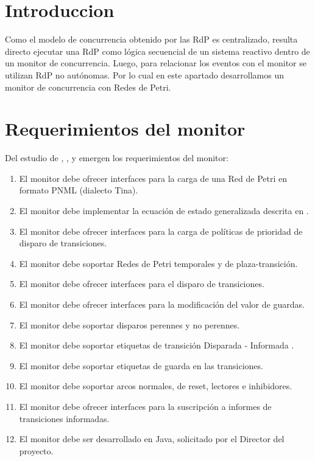 \section{Introduccion}
\label{sec:petri_concurrency_monitor_intro}
Como el modelo de concurrencia obtenido por las RdP es centralizado, resulta
directo ejecutar una RdP como lógica secuencial de un sistema reactivo dentro
de un monitor de concurrencia. Luego, para relacionar los eventos con el
monitor se utilizan RdP no autónomas. Por lo cual en este apartado desarrollamos
un monitor de concurrencia con Redes de Petri.

\section{Requerimientos del monitor}
Del estudio de \cite{Ecuacion_generalizada_LAC}, \cite{codegen}, \cite{chimp} y
\cite{Bentivegna-Ludemann} emergen los requerimientos del monitor:
    \begin{enumerate}
      \item El monitor debe ofrecer interfaces para la carga de una Red de
      Petri en formato PNML (dialecto Tina).
      \item El monitor debe implementar la ecuación de estado generalizada
      descrita en \cite{Ecuacion_generalizada_LAC}.
      \item El monitor debe ofrecer interfaces para la carga de políticas de
      prioridad de disparo de transiciones.
      \item El monitor debe soportar Redes de Petri temporales y de
      plaza-transición.
      \item El monitor debe ofrecer interfaces para el disparo de
      transiciones.
      \item El monitor debe ofrecer interfaces para la modificación del
      valor de guardas.
      \item El monitor debe soportar disparos perennes y no perennes.
      \item El monitor debe soportar etiquetas de transición Disparada -
      Informada \cite{codegen}.
      \item El monitor debe soportar etiquetas de guarda en las
      transiciones.
      \item El monitor debe soportar arcos normales, de reset, lectores e
      inhibidores.
      \item El monitor debe ofrecer interfaces para la suscripción a
      informes de transiciones informadas.
      \item El monitor debe ser desarrollado en Java, solicitado por el
      Director del proyecto.
    \end{enumerate}

